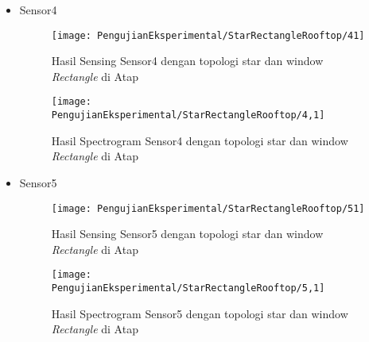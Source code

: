 \begin{itemize}
\begin{comment}
$55Hz$  & 1.2263178883748882E-4  & 4.609230448653417E-4 \\
$56Hz$  & 8.678372676674111E-5  & 3.6616120882854543E-4 \\
$57Hz$  & 2.2644803464173723E-4  & 3.382432527305666E-4 \\
$58Hz$  & 4.0079288362935894E-4  & 3.337135113387486E-4 \\
$59Hz$  & 4.8027730276264914E-4  & 3.0523611123805313E-4 \\
$60Hz$  & 3.75854861134534E-4  & 2.319708500522278E-4 \\
$61Hz$  & 7.414000900829172E-5  & 6.13626623908586E-5 \\
$62Hz$  & 2.821018989457627E-4  & 1.9734178021760525E-4 \\
$63Hz$  & 5.311479475528726E-4  & 2.580831824219634E-4 \\
$64Hz$  & 6.52523701129037E-4  & 2.686016871668818E-4 \\
\end{longtable}
\end{center}
\end{comment}

\item Sensor4
\begin{figure}[H]
	\centering
	\texttt{[image: PengujianEksperimental/StarRectangleRooftop/41]}
	\caption[Hasil Sensing Sensor4 dengan topologi star dan window {\it Rectangle} di Atap]{Hasil Sensing Sensor4 dengan topologi star dan window {\it Rectangle} di Atap} 
	\label{fig:hasilAtapStarRect41}
\end{figure}

\begin{figure}[H]
	\centering
	\texttt{[image: PengujianEksperimental/StarRectangleRooftop/4,1]}
	\caption[Hasil Spectrogram Sensor4 dengan topologi star dan window {\it Rectangle} di Atap]{Hasil Spectrogram Sensor4 dengan topologi star dan window {\it Rectangle} di Atap} 
	\label{fig:hasilAtapStarRect4,1}
\end{figure}

\item Sensor5
\begin{figure}[H]
	\centering
	\texttt{[image: PengujianEksperimental/StarRectangleRooftop/51]}
	\caption[Hasil Sensing Sensor5 dengan topologi star dan window {\it Rectangle} di Atap]{Hasil Sensing Sensor5 dengan topologi star dan window {\it Rectangle} di Atap} 
	\label{fig:hasilAtapStarRect51}
\end{figure}

\begin{figure}[H]
	\centering
	\texttt{[image: PengujianEksperimental/StarRectangleRooftop/5,1]}
	\caption[Hasil Spectrogram Sensor5 dengan topologi star dan window {\it Rectangle} di Atap]{Hasil Spectrogram Sensor5 dengan topologi star dan window {\it Rectangle} di Atap} 
	\label{fig:hasilAtapStarRect5,1}
\end{figure}
\end{itemize}

